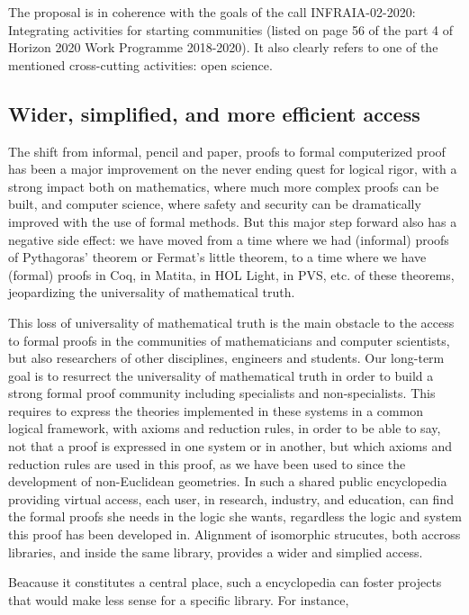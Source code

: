 The proposal is in coherence with the goals of the call INFRAIA-02-2020:
Integrating activities for starting communities (listed on page 56 of
the part 4 of Horizon 2020 Work Programme 2018-2020). It also clearly
refers to one of the mentioned cross-cutting activities: open science.

\subsection{Wider, simplified, and more efficient access}

The shift from informal, pencil and paper, proofs to formal
computerized proof has been a major improvement on the never ending
quest for logical rigor, with a strong impact both on mathematics,
where much more complex proofs can be built, and computer science,
where safety and security can be dramatically improved with the use of
formal methods.  But this major step forward also has a negative side
effect: we have moved from a time where we had (informal) proofs of
Pythagoras' theorem or Fermat's little theorem, to a time where we
have (formal) proofs in {\sc Coq}, in {\sc Matita}, in {\sc HOL
  Light}, in {\sc PVS}, etc.  of these theorems, jeopardizing the
universality of mathematical truth.

This loss of universality of mathematical truth is the main obstacle
to the access to formal proofs in the communities of mathematicians
and computer scientists, but also researchers of other disciplines,
engineers and students.  Our long-term goal is to resurrect the
universality of mathematical truth in order to build a strong formal
proof community including specialists and non-specialists.  This
requires to express the theories implemented in these systems in a
common logical framework, with axioms and reduction rules, in order to
be able to say, not that a proof is expressed in one system or in
another, but which axioms and reduction rules are used in this proof,
as we have been used to since the development of non-Euclidean
geometries. In such a shared public encyclopedia providing virtual
access, each user, in research, industry, and education, can find the
formal proofs she needs in the logic she wants, regardless the logic
and system this proof has been developed in.  Alignment of isomorphic
strucutes, both accross libraries, and inside the same library,
provides a wider and simplied access.

Beacause it constitutes a central place, such a encyclopedia can foster
projects that would make less sense for a specific library. For instance,

